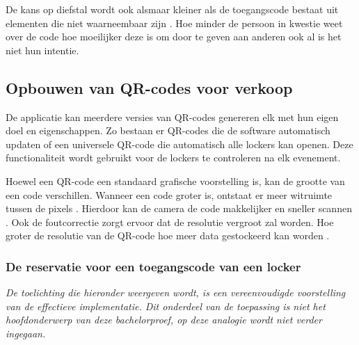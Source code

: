De kans op diefstal wordt ook alsmaar kleiner als de toegangscode bestaat uit elementen die niet waarneembaar zijn \autocite{Baharav2013}. Hoe minder de persoon in kwestie weet over de code hoe moeilijker deze is om door te geven aan anderen ook al is het niet hun intentie.
\newpage
\subsection{Opbouwen van QR-codes voor verkoop}%
\label{sec:opbouwQR-codeVerkoop}

De applicatie kan meerdere versies van QR-codes genereren elk met hun eigen doel en eigenschappen. Zo bestaan er QR-codes die de software automatisch updaten of een universele QR-code die automatisch alle lockers kan openen. Deze functionaliteit wordt gebruikt voor de lockers te controleren na elk evenement. 

Hoewel een QR-code een standaard grafische voorstelling is, kan de grootte van een code verschillen. Wanneer een code groter is, ontstaat er meer witruimte tussen de pixels \autocite{Li2018}. Hierdoor kan de camera de code makkelijker en sneller scannen \autocite{Karrach2020}. Ook de foutcorrectie zorgt ervoor dat de resolutie vergroot zal worden. Hoe groter de resolutie van de QR-code hoe meer data gestockeerd kan worden \autocite{Chow2016}. 

\subsubsection{De reservatie voor een toegangscode van een locker}%
\label{sec:opbouwQR-codeVerkoop1}

\textit {De toelichting die hieronder weergeven wordt, is een vereenvoudigde voorstelling van de effectieve implementatie. Dit onderdeel van de toepassing is niet het hoofdonderwerp van deze bachelorproef, op deze analogie wordt niet verder ingegaan.}

